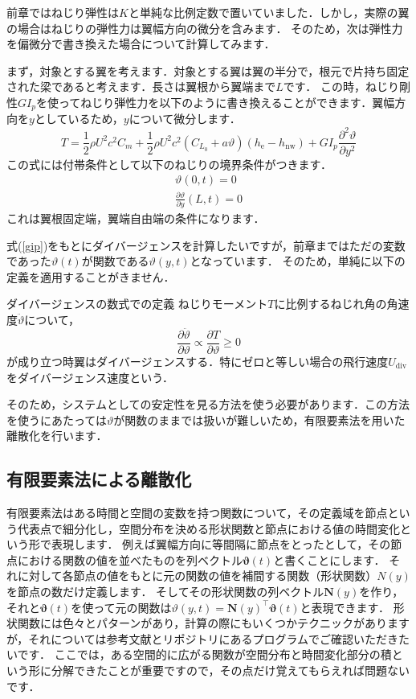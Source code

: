 \documentclass{jarticle}
\begin{document}
前章ではねじり弾性は$K$と単純な比例定数で置いていました．しかし，実際の翼の場合はねじりの弾性力は翼幅方向の微分を含みます．
そのため，次は弾性力を偏微分で書き換えた場合について計算してみます．

まず，対象とする翼を考えます．対象とする翼は翼の半分で，根元で片持ち固定された梁であると考えます．長さは翼根から翼端まで$L$です．
この時，ねじり剛性$GI_p$を使ってねじり弾性力を以下のように書き換えることができます．翼幅方向を$y$としているため，$y$について微分します．
\begin{equation} \label{gip}
    T = \frac{1}{2}\rho U^2 c^2 C_m + \frac{1}{2}\rho U^2 c^2 (C_{L_0} + a\vartheta)  (h_\mathrm{e}-h_\mathrm{nw}) + GI_p \frac{\partial^2 \vartheta}{\partial y^2}
\end{equation}
この式には付帯条件として以下のねじりの境界条件がつきます．
\begin{align}
    \vartheta(0,t) = 0 \\
    \frac{\partial \vartheta}{\partial y}(L,t) = 0
\end{align}
これは翼根固定端，翼端自由端の条件になります．

式(\ref{gip})をもとにダイバージェンスを計算したいですが，前章まではただの変数であった$\vartheta(t)$が関数である$\vartheta(y,t)$となっています．
そのため，単純に以下の定義を適用することがきません．
\begin{itembox}[l]{ダイバージェンスの数式での定義}
    ねじりモーメント$T$に比例するねじれ角の角速度$\ddot{\vartheta}$について，
    \begin{equation*}
        \frac{\partial \ddot{\vartheta}}{\partial \vartheta} \propto \frac{\partial T}{\partial \vartheta} \geq 0
    \end{equation*}
    が成り立つ時翼はダイバージェンスする．特にゼロと等しい場合の飛行速度$U_\mathrm{div}$をダイバージェンス速度という．
\end{itembox}
そのため，システムとしての安定性を見る方法を使う必要があります．この方法を使うにあたっては$\vartheta$が関数のままでは扱いが難しいため，有限要素法を用いた離散化を行います．

\subsection{有限要素法による離散化}

有限要素法はある時間と空間の変数を持つ関数について，その定義域を節点という代表点で細分化し，空間分布を決める形状関数と節点における値の時間変化という形で表現します．
例えば翼幅方向に等間隔に節点をとったとして，その節点における関数の値を並べたものを列ベクトル$\bm{\vartheta}(t)$と書くことにします．
それに対して各節点の値をもとに元の関数の値を補間する関数（形状関数）$N(y)$を節点の数だけ定義します．
そしてその形状関数の列ベクトル$\bm{N}(y)$を作り，それと$\bm{\vartheta}(t)$を使って元の関数は$\vartheta(y,t) = \bm{N}(y)^\top\bm{\vartheta}(t)$と表現できます．
形状関数には色々とパターンがあり，計算の際にもいくつかテクニックがありますが，それについては参考文献とリポジトリにあるプログラムでご確認いただきたいです．
ここでは，ある空間的に広がる関数が空間分布と時間変化部分の積という形に分解できたことが重要ですので，その点だけ覚えてもらえれば問題ないです．
\end{document}
